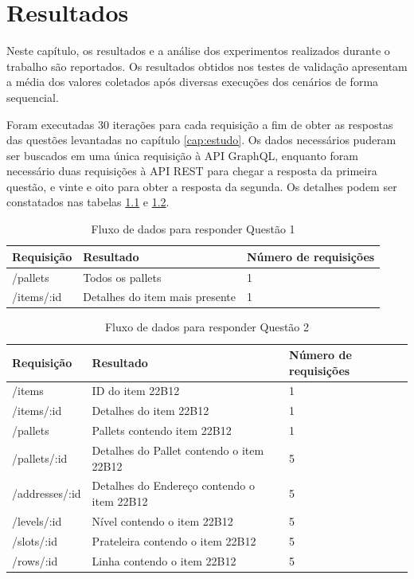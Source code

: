 \chapter{Resultados}

Neste capítulo, os resultados e a análise dos experimentos realizados durante o trabalho são reportados. Os resultados obtidos nos testes de validação apresentam a média dos valores coletados após diversas execuções dos cenários de forma sequencial.

Foram executadas 30 iterações para cada requisição a fim de obter as respostas das questões levantadas no capítulo \ref{cap:estudo}. Os dados necessários puderam ser buscados em uma única requisição à API GraphQL, enquanto foram necessário duas requisições à API REST para chegar a resposta da primeira questão, e vinte e oito para obter a resposta da segunda. Os detalhes podem ser constatados nas tabelas \ref{tab:request-table1} e \ref{tab:request-table2}.

\begin{table}[htbp]
    \centering
    \begin{tabular}{| l | l | l |}
        \hline
        \textbf{Requisição} & \textbf{Resultado} & \textbf{Número de requisições} \\ \hline
        /pallets & Todos os pallets & 1 \\ \hline
        /items/:id & Detalhes do item mais presente & 1 \\ \hline
    \end{tabular}
    \caption{Fluxo de dados para responder Questão 1} 
    \label{tab:request-table1}
\end{table}

\begin{table}[htbp]
    \centering
    \begin{tabular}{| l | l | l |}
        \hline
        \textbf{Requisição} & \textbf{Resultado} & \textbf{Número de requisições} \\ \hline
        /items & ID do item 22B12 & 1 \\ \hline
        /items/:id & Detalhes do item 22B12 & 1 \\ \hline
        /pallets & Pallets contendo item 22B12 & 1 \\ \hline
        /pallets/:id & Detalhes do Pallet contendo o item 22B12 & 5 \\ \hline
        /addresses/:id & Detalhes do Endereço contendo o item 22B12 & 5 \\ \hline
        /levels/:id & Nível contendo o item 22B12 & 5 \\ \hline
        /slots/:id & Prateleira contendo o item 22B12 & 5  \\ \hline
        /rows/:id & Linha contendo o item 22B12 & 5 \\ \hline
    \end{tabular}
    \caption{Fluxo de dados para responder Questão 2} 
    \label{tab:request-table2}
\end{table}

